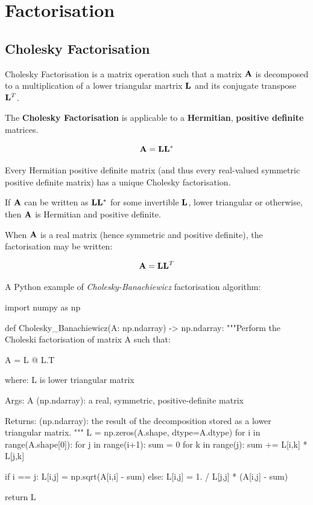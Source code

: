 \section{Factorisation}

\subsection{Cholesky Factorisation}

Cholesky Factorisation is a matrix operation such that a matrix $ \mathbf{A} $ is
decomposed to a multiplication of a lower triangular martrix $ \mathbf{L} $ and its
conjugate transpose $ \mathbf{L}^T $.

The \textbf{Cholesky Factorisation} is applicable to a \textbf{Hermitian},
\textbf{positive definite} matrices.

\begin{equation}
    \mathbf{A} = \mathbf{L} \mathbf{L}^*
\end{equation}

Every Hermitian positive definite matrix (and thus every real-valued symmetric
positive definite matrix) has a unique Cholesky factorisation.

If $ \mathbf{A} $ can be written as $ \mathbf{L} \mathbf{L}^* $ for some invertible $ \mathbf{L} $,
lower triangular or otherwise, then $ \mathbf{A} $ is Hermitian and positive definite.

When $ \mathbf{A} $ is a real matrix (hence symmetric and positive definite), the
factorisation may be written:

\begin{equation}
    \mathbf{A} = \mathbf{L} \mathbf{L}^T
\end{equation}

A Python example of \textit{Cholesky-Banachiewicz} factorisation algorithm:

\begin{python}
import numpy as np

def Cholesky_Banachiewicz(A: np.ndarray) -> np.ndarray:
    """Perform the Choleski factorisation of matrix A such that:

    A = L @ L.T

    where:
        L is lower triangular matrix

    Args:
        A (np.ndarray): a real, symmetric, positive-definite matrix

    Returns:
        (np.ndarray): the result of the decomposition stored as a lower triangular
        matrix.
    """
    L = np.zeros(A.shape, dtype=A.dtype)
    for i in range(A.shape[0]):
        for j in range(i+1):
            sum = 0
            for k in range(j):
                sum += L[i,k] * L[j,k]

            if i == j:
                L[i,j] = np.sqrt(A[i,i] - sum)
            else:
                L[i,j] = 1. / L[j,j] * (A[i,j] - sum)

    return L
\end{python}

